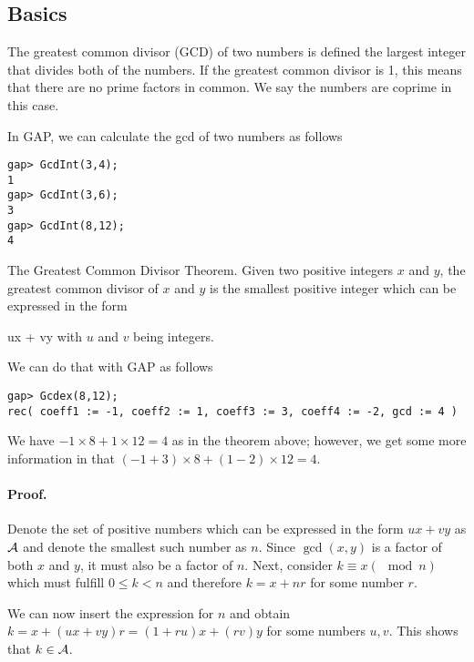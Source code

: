 
\subsection{Basics}

\begin{definition}
The greatest common divisor (GCD) of two numbers is defined the largest integer that divides both of the numbers. If the greatest common divisor is 1, this means that there are no prime factors in common. We say the numbers are coprime in this case.
\end{definition}

In GAP, we can calculate the gcd of two numbers as follows

\begin{verbatim}
gap> GcdInt(3,4);
1
gap> GcdInt(3,6);
3
gap> GcdInt(8,12);
4
\end{verbatim}

\begin{theorem}
The Greatest Common Divisor Theorem. Given two positive integers $x$ and $y$, the greatest common divisor of $x$ and $y$ is the smallest positive integer which can be expressed in the form

\bee
ux + vy
\eee
%
with $u$ and $v$ being integers.
\end{theorem}

We can do that with GAP as follows

\begin{verbatim}
gap> Gcdex(8,12);
rec( coeff1 := -1, coeff2 := 1, coeff3 := 3, coeff4 := -2, gcd := 4 )
\end{verbatim}

We have $-1 \times 8 + 1 \times 12 = 4$ as in the theorem above; however, we get some more information in that $(-1 + 3) \times 8 + (1 - 2) \times 12 = 4$.

\paragraph{Proof.} Denote the set of positive numbers which can be expressed in the form $ux + vy$ as $\mathcal{A}$ and denote the smallest such number as $n$. Since $\gcd(x,y)$ is a factor of both $x$ and $y$, it must also be a factor of $n$. Next, consider $k \equiv x (\mod n)$ which must fulfill $0 \leq k < n$ and therefore $k = x + nr$ for some number $r$. 

We can now insert the expression for $n$ and obtain $k = x + (ux + vy)r = (1+ru)x + (rv)y$ for some numbers $u, v$. This shows that $k \in \mathcal{A}$. 


